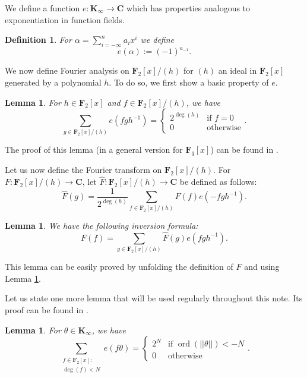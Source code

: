 \documentclass[11pt, reqno]{amsart}
\newtheorem{lemma}[theorem]{Lemma}
\newtheorem*{definition}{Definition}
\numberwithin{equation}{section}
\newcommand{\zff}{\mathbf{F}_2[x]}
\newcommand\ord{\operatorname{ord}}
\begin{document}
We define a function $e: \mathbf{K}_{\infty} \rightarrow \mathbf{C}$ which has properties analogous to exponentiation in function fields.

\begin{definition}
    For $\alpha=\sum_{i=-\infty}^{n} a_ix^i$ we define $$e(\alpha) := (-1)^{a_{-1}}.$$
\end{definition}

We now define Fourier analysis on $\mathbf{F}_2[x]/(h)$ for $(h)$ an ideal in $\mathbf{F}_2[x]$ generated by a polynomial $h$. To do so, we first show a basic property of $e$.

\begin{lemma}
\label{indicator_mod_r}
    For $h \in \mathbf{F}_2[x]$ and $f \in \mathbf{F}_2[x] / (h)$, we have $$\sum_{g \in \mathbf{F}_2[x] / (h)} e(fgh^{-1})=\begin{cases}
        2^{\deg(h)} & \text{if $f=0$} \\
        0 & \text{otherwise}
    \end{cases}.$$
\end{lemma}

The proof of this lemma (in a general version for $\mathbf{F}_q[x]$) can be found in \cite[Chapter 5.1]{cubics}.

Let us now define the Fourier transform on $\mathbf{F}_2[x]/(h)$.
For $F: \mathbf{F}_2[x]/(h) \rightarrow \mathbf{C}$, let $\widehat{F}: \mathbf{F}_2[x]/(h) \rightarrow \mathbf{C}$ be defined as follows:
\begin{equation}
    \widehat{F}(g) = \frac{1}{2^{\deg (h)}} \sum_{f \in \mathbf{F}_2[x]/(h)}F(f)e(-fgh^{-1}).
\end{equation}

\begin{lemma}
    We have the following inversion formula: $$F(f)=\sum_{g \in \mathbf{F}_2[x]/(h)} \widehat{F}(g)e(fgh^{-1}).$$
\end{lemma}

This lemma can be easily proved by unfolding the definition of $\widehat{F}$ and using Lemma \ref{indicator_mod_r}.

Let us state one more lemma that will be used regularly throughout this note. Its proof can be found in \cite[Chapter 5.1]{cubics}.

\begin{lemma}
\label{exponnents_monic}
    For $\theta \in \mathbf{K}_{\infty}$, we have
    $$\sum_{\substack{f \in \zff: \\ \deg(f) < N}} e(f\theta)=\begin{cases}
        2^N & \text{if } \ord(||\theta||) < -N\\
        0 & \text{otherwise}
    \end{cases}.$$
\end{lemma}
\end{document}
